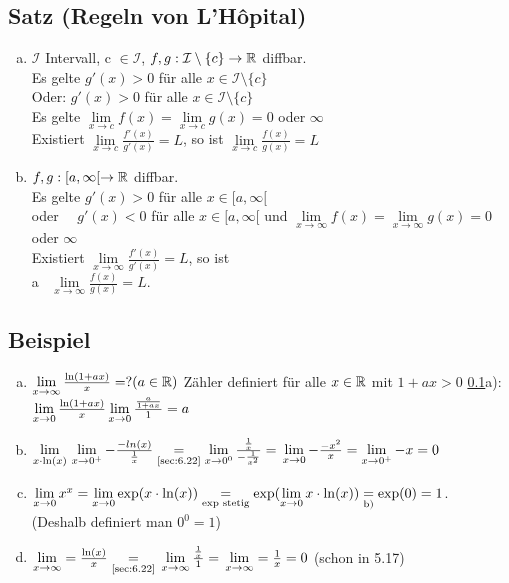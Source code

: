 	\subsection{Satz (Regeln von L'Hôpital)} \label{sec:6.22}
	\begin{enumerate}[a)]
		\item $\mathcal{I}$ Intervall, c $\in \mathcal{I}$, $f,g: \mathcal{I} \setminus \{c\} \to \mathbb{R} $ diffbar.\\
		Es gelte $g'(x) > 0$ für alle $ x \in \mathcal{I} \setminus \{c\}$\\
		Oder\quad : $g'(x) > 0$ für alle $ x \in \mathcal{I} \setminus \{c\}$\\
		Es gelte $\lim\limits_{x \to c} f(x) = \lim\limits_{x \to c} g(x) = 0$ oder $ \infty$\\
		Existiert $\lim\limits_{x \to c} \frac{f'(x)}{g'(x)} = L$, so ist $\lim\limits_{x \to c} \frac{f(x)}{g(x)} = L$
		\item $f,g : [a,\infty[ \to \mathbb{R} $ diffbar.\\
		Es gelte $ g'(x) > 0$ für alle $x \in [a,\infty[ $\\
		oder \ \ \quad $g'(x) < 0$ für alle $x \in [a,\infty[ $
		und $\lim\limits_{x \to \infty} f(x) = \lim\limits_{x \to \infty} g(x) = 0 $ oder $\infty$ \\
		Existiert $\lim\limits_{x \to \infty} \frac{f'(x)}{g'(x)} = L$, so ist \\
		a \ \qquad \quad $\lim\limits_{x \to \infty} \frac{f(x)}{g(x)} = L.$
	\end{enumerate}
	\subsection{Beispiel} \label{sec:6.23}
	\begin{enumerate}[a)]
		\item $\lim\limits_{x \to \infty} \frac{\ln(1 + ax)}{x} = ? (a \in \mathbb{R})$ Zähler definiert für alle $x \in \mathbb{R}$ mit $1+ax >0$ \ref{sec:6.22}a):\\
		$\lim\limits_{x \to 0} \frac{\ln(1 +ax )}{x}\\
		\lim\limits_{x \to 0} \frac{\frac{a}{1+ ax}}{1} = a$\\
		\item $\lim\limits_{x \cdot \ln(x)}\\
		\lim\limits_{x\to 0^+} - \frac{-ln(x)}{\frac{1}{x}} \underset{\text{\ref{sec:6.22}}}{=} \lim\limits_{x \to 0^0} \frac{\frac{1}{x}}{-\frac{1}{x^2}}=\\
		\lim\limits_{x \to 0}-\frac{-x^2}{x} = \lim\limits_{x \to 0^+} - x = 0 $
		\item $\lim\limits_{x \to 0} x^x = \lim\limits_{x \to 0} \exp(x \cdot \ln(x))\\
		\underset{\text{exp stetig}}{=} \exp(\lim\limits_{x \to 0} x \cdot \ln(x)) \underset{\text{b)}}{=} \exp(0) =1$.\\
		(Deshalb definiert man $0^0 = 1$)
		\item $\lim\limits_{x \to \infty} = \frac{\ln(x)}{x}  \underset{\text{\ref{sec:6.22}}}{=}\\
		\lim\limits_{x \to \infty} \frac{\frac{1}{x}}{1} =\\
		\lim\limits_{x \to \infty} = \frac{1}{x} = 0$ (schon in 5.17)
	\end{enumerate}
